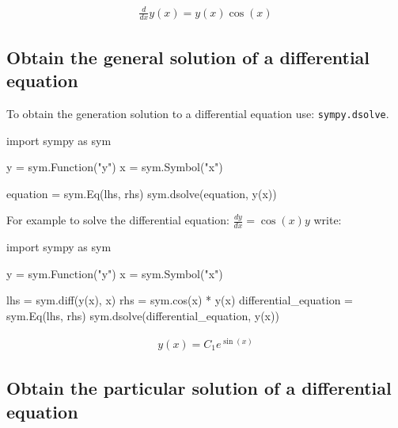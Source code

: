 \begin{equation*}
\begin{split}\displaystyle \frac{d}{d x} y{\left(x \right)} = y{\left(x \right)} \cos{\left(x \right)}\end{split}
\end{equation*}




\subsection{Obtain the general solution of a differential equation}
\label{\detokenize{tools-for-mathematics/09-differential-equations/how/main:how-to-obtain-the-general-solution-of-a-differential-equation}}

To obtain the generation solution to a differential equation use:
\texttt{sympy.dsolve}.


\begin{api}
import sympy as sym

y = sym.Function("y")
x = sym.Symbol("x")

equation = sym.Eq(lhs, rhs)
sym.dsolve(equation, y(x))
\end{api}



For example to solve the differential equation: \(\frac{dy}{dx} = \cos(x) y\) 
write:


\begin{pyin}
import sympy as sym

y = sym.Function("y")
x = sym.Symbol("x")

lhs = sym.diff(y(x), x)
rhs = sym.cos(x) * y(x)
differential_equation = sym.Eq(lhs, rhs)
sym.dsolve(differential_equation, y(x))
\end{pyin}




\begin{equation*}
\begin{split}\displaystyle y{\left(x \right)} = C_{1} e^{\sin{\left(x \right)}}\end{split}
\end{equation*}




\subsection{Obtain the particular solution of a differential equation}
\label{\detokenize{tools-for-mathematics/09-differential-equations/how/main:how-to-obtain-the-particular-solution-of-a-differential-equation}}

